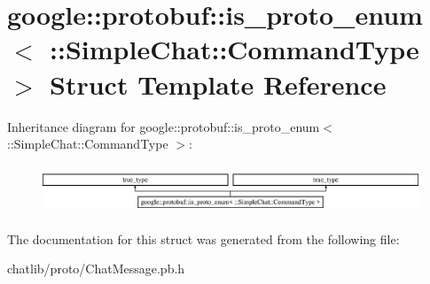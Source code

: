 \hypertarget{structgoogle_1_1protobuf_1_1is__proto__enum_3_01_1_1SimpleChat_1_1CommandType_01_4}{\section{google\-:\-:protobuf\-:\-:is\-\_\-proto\-\_\-enum$<$ \-:\-:Simple\-Chat\-:\-:Command\-Type $>$ Struct Template Reference}
\label{structgoogle_1_1protobuf_1_1is__proto__enum_3_01_1_1SimpleChat_1_1CommandType_01_4}
}
Inheritance diagram for google\-:\-:protobuf\-:\-:is\-\_\-proto\-\_\-enum$<$ \-:\-:Simple\-Chat\-:\-:Command\-Type $>$\-:\begin{figure}[H]
\begin{center}
\leavevmode
\includegraphics[height=1.469816cm]{structgoogle_1_1protobuf_1_1is__proto__enum_3_01_1_1SimpleChat_1_1CommandType_01_4}
\end{center}
\end{figure}


The documentation for this struct was generated from the following file\-:\begin{DoxyCompactItemize}
\item 
chatlib/proto/Chat\-Message.\-pb.\-h\end{DoxyCompactItemize}
